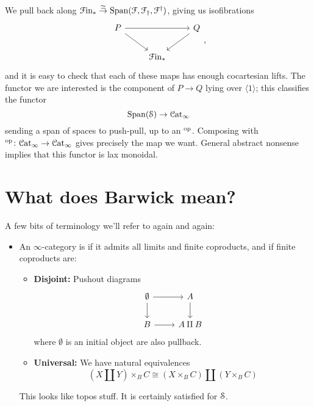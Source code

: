 \documentclass[main.tex]{subfiles}
\begin{document}
We pull back along $\Finp \overset{\simeq}{\to} \Span\triple{F}$, giving us isofibrations
\begin{equation*}
  \begin{tikzcd}
    P
    \arrow[rr]
    \arrow[dr]
    && Q
    \arrow[dl]
    \\
    & \Finp
  \end{tikzcd},
\end{equation*}
and it is easy to check that each of these maps has enough cocartesian lifts. The functor we are interested is the component of $P \to Q$ lying over $\langle 1 \rangle$; this classifies the functor
\begin{equation*}
  \Span(\S) \to \ICat
\end{equation*}
sending a span of spaces to push-pull, up to an $\op$. Composing with $\op\colon \ICat \to \ICat$ gives precisely the map we want. General abstract nonsense implies that this functor is lax monoidal.


\section{What does Barwick mean?}
\label{sec:what_does_barwick_mean_}

A few bits of terminology we'll refer to again and again:
\begin{itemize}
  \item An $\infty$-category is  if it admits all limits and finite coproducts, and if finite coproducts are:
    \begin{itemize}
      \item \textbf{Disjoint:} Pushout diagrams
        \begin{equation*}
          \begin{tikzcd}
            \emptyset
            \arrow[r]
            \arrow[d]
            & A
            \arrow[d]
            \\
            B
            \arrow[r]
            & A \amalg B
          \end{tikzcd}
        \end{equation*}
        where $\emptyset$ is an initial object are also pullback.

      \item \textbf{Universal:} We have natural equivalences
        \begin{equation*}
          (X \amalg Y) \times_{B} C \cong \left( X \times_{B} C \right) \amalg \left( Y \times_{B} C \right)
        \end{equation*}
    \end{itemize}
    This looks like topos stuff. It is certainly satisfied for $\S$.
\end{itemize}
\end{document}

